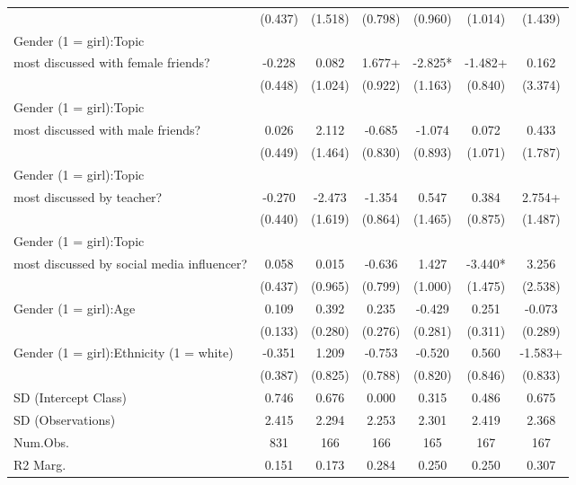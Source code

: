 \documentclass[
  letterpaper,
  DIV=11,
  numbers=noendperiod]{scrreprt}
\begin{document}
\begin{table}
\begin{tabular}[t]{lcccccc}
\hspace{1em} & (0.437) & (1.518) & (0.798) & (0.960) & (1.014) & (1.439)\\
Gender (1 = girl):Topic\\
most discussed with female friends? & -0.228 & 0.082 & 1.677+ & -2.825* & -1.482+ & 0.162\\
\hspace{1em} & (0.448) & (1.024) & (0.922) & (1.163) & (0.840) & (3.374)\\
Gender (1 = girl):Topic\\
most discussed with male friends? & 0.026 & 2.112 & -0.685 & -1.074 & 0.072 & 0.433\\
\hspace{1em} & (0.449) & (1.464) & (0.830) & (0.893) & (1.071) & (1.787)\\
Gender (1 = girl):Topic\\
most discussed by teacher? & -0.270 & -2.473 & -1.354 & 0.547 & 0.384 & 2.754+\\
\hspace{1em} & (0.440) & (1.619) & (0.864) & (1.465) & (0.875) & (1.487)\\
Gender (1 = girl):Topic\\
most discussed by social media influencer? & 0.058 & 0.015 & -0.636 & 1.427 & -3.440* & 3.256\\
\hspace{1em} & (0.437) & (0.965) & (0.799) & (1.000) & (1.475) & (2.538)\\
Gender (1 = girl):Age & 0.109 & 0.392 & 0.235 & -0.429 & 0.251 & -0.073\\
\hspace{1em} & (0.133) & (0.280) & (0.276) & (0.281) & (0.311) & (0.289)\\
Gender (1 = girl):Ethnicity (1 = white) & -0.351 & 1.209 & -0.753 & -0.520 & 0.560 & -1.583+\\
\hspace{1em} & (0.387) & (0.825) & (0.788) & (0.820) & (0.846) & (0.833)\\
\hspace{1em}SD (Intercept Class) & 0.746 & 0.676 & 0.000 & 0.315 & 0.486 & 0.675\\
\hspace{1em}SD (Observations) & 2.415 & 2.294 & 2.253 & 2.301 & 2.419 & 2.368\\
\midrule
\hspace{1em}Num.Obs. & 831 & 166 & 166 & 165 & 167 & 167\\
\hspace{1em}R2 Marg. & 0.151 & 0.173 & 0.284 & 0.250 & 0.250 & 0.307\\

\end{tabular}
\end{table}
\end{document}
